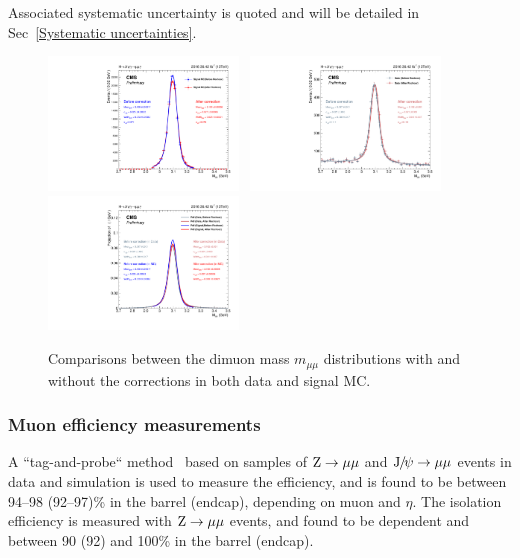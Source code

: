		Associated systematic uncertainty is quoted and will be detailed in Sec~\ref{Systematic uncertainties}.
		\begin{figure}[p]
		  \centering
		  \includegraphics[width=0.45\textwidth]{Fig/Rochcor_forJpsi/mJpsi_Rochcor_BWConvCB_SignalMC}~
		  \includegraphics[width=0.45\textwidth]{Fig/Rochcor_forJpsi/mJpsi_Rochcor_BWConvCB}\\
		  \includegraphics[width=0.45\textwidth]{Fig/Rochcor_forJpsi/mJpsi_Rochcor_BWConvCB_DataMC}\\
		  \caption{Comparisons between the dimuon mass $m_{\mu\mu}$ distributions with and without the corrections in both data and signal MC.}
		  \label{fig:RochcorForJpsi}
		\end{figure}
		
		\subsubsection{Muon efficiency measurements}
		A ``tag-and-probe`` method~\cite{cite:tagandprobe} based on samples of $\mathrm{Z}\to\mu\mu$ and ${\mathrm{J}\hspace{-.08em}/\hspace{-.14em}\psi}\to\mu\mu$ events in data and simulation is used to measure the efficiency, and is found to be between 94--98 (92--97)\% in the barrel (endcap), depending on muon \pt and $\eta$. The isolation efficiency is measured with $\mathrm{Z}\to\mu\mu$ events, and found to be \pt dependent and between 90 (92) and 100\% in the barrel (endcap).
		
